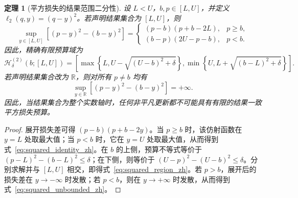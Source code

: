 \documentclass[UTF8,11pt]{ctexart}
\newtheorem{theorem}{定理}
\newcommand{\R}{\mathbb{R}}
\begin{document}
\begin{theorem}[平方损失的结果范围二分性]
\label{thm:squared_geometry_zh}
设 $L<U$，$b,p\in[L,U]$，并定义 $\ell_2(q,y)=(q-y)^2$。若声明结果集合为 $[L,U]$，则
\begin{equation}
  \sup_{y\in[L,U]}\left[(p-y)^2-(b-y)^2\right]
  =
  \begin{cases}
    (p-b)(p+b-2L), & p\geq b,\\
    (b-p)(2U-p-b), & p<b.
  \end{cases}
  \label{eq:squared_identity_zh}
\end{equation}
因此，精确有限预算域为
\begin{equation}
  \mathcal H^{(2)}_{\delta}(b;[L,U])
  =\left[
  \max\!\left\{L,U-\sqrt{(U-b)^2+\delta}\right\},
  \min\!\left\{U,L+\sqrt{(b-L)^2+\delta}\right\}
  \right].
  \label{eq:squared_region_zh}
\end{equation}
若声明结果集合改为 $\R$，则对所有 $p\neq b$ 均有
\begin{equation}
  \sup_{y\in\R}\left[(p-y)^2-(b-y)^2\right]=+\infty.
  \label{eq:squared_unbounded_zh}
\end{equation}
因此，当结果集合为整个实数轴时，任何非平凡更新都不可能具有有限的结果一致平方损失预算。
\end{theorem}
\begin{proof}
展开损失差可得 $(p-b)(p+b-2y)$。当 $p\geq b$ 时，该仿射函数在 $y=L$ 处取最大值；当 $p<b$ 时，它在 $y=U$ 处取最大值，从而得到式~\eqref{eq:squared_identity_zh}。在 $b$ 的上侧，预算不等式等价于 $(p-L)^2-(b-L)^2\leq\delta$；在下侧，则等价于 $(U-p)^2-(U-b)^2\leq\delta$。分别求解并与 $[L,U]$ 相交，即得式~\eqref{eq:squared_region_zh}。若 $p>b$，展开后的损失差在 $y\to-\infty$ 时发散；若 $p<b$，则在 $y\to+\infty$ 时发散，从而得到式~\eqref{eq:squared_unbounded_zh}。
\end{proof}
\end{document}
